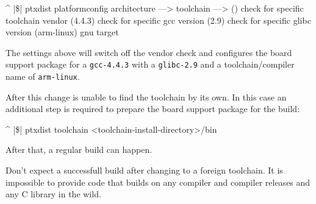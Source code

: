 \begin{ptxshell}[escapechar=|]{^}
|\$| ptxdist platformconfig
 architecture --->
   toolchain  --->
      ()  check for specific toolchain vendor
      (4.4.3) check for specific gcc version
      (2.9) check for specific glibc version
      (arm-linux) gnu target
\end{ptxshell}

The settings above will switch off the vendor check and configures the board
support package for a \texttt{gcc-4.4.3} with a \texttt{glibc-2.9} and a
toolchain/compiler name of \texttt{arm-linux}.

After this change \ptxdist{} is unable to find the toolchain by its own. In
this case an additional step is required to prepare the board support package
for the build:

\begin{ptxshell}[escapechar=|]{^}
|\$| ptxdist toolchain <toolchain-install-directory>/bin
\end{ptxshell}

After that, a regular build can happen.

\begin{important}
Don't expect a successfull build after changing to a foreign toolchain. It is
impossible to provide code that builds on any compiler and compiler releases and
any C library in the wild.
\end{important}
